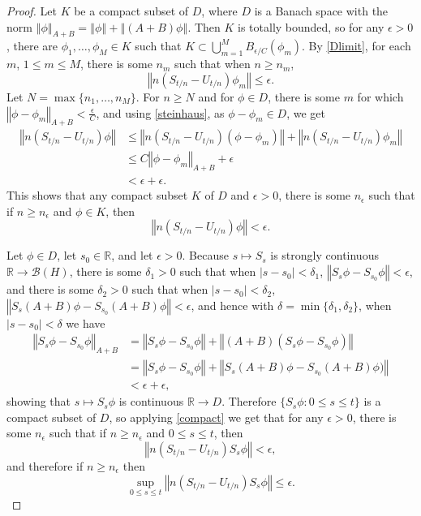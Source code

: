 \documentclass{article}
\newcommand{\norm}[1]{\left\Vert #1 \right\Vert}
\theoremstyle{definition}
\begin{document}
\begin{proof}
Let $K$ be a compact subset of $D$, where $D$ is a Banach space with the norm $\norm{\phi}_{A+B}=\norm{\phi}+\norm{(A+B)\phi}$. 
Then $K$ is totally bounded, so for any $\epsilon>0$, there are $\phi_1,\ldots,\phi_M \in K$ such that
$K \subset \bigcup_{m=1}^M B_{\epsilon/C}(\phi_m)$.
By \eqref{Dlimit}, for each $m$, $1 \leq m \leq M$, there is some $n_m$ such that when $n \geq n_m$,
\[
\norm{n(S_{t/n}-U_{t/n})\phi_m} \leq \epsilon.
\]
Let $N=\max\{n_1,\ldots,n_M\}$. 
For $n \geq N$ and
for $\phi \in D$, there is some $m$ for which
$\norm{\phi-\phi_m}_{A+B} < \frac{\epsilon}{C}$, 
and using \eqref{steinhaus}, as $\phi-\phi_m \in D$, we get
\begin{align*}
\norm{n(S_{t/n}-U_{t/n})\phi}&\leq \norm{n(S_{t/n}-U_{t/n})(\phi-\phi_m)}
+\norm{n(S_{t/n}-U_{t/n})\phi_m}\\
&\leq C\norm{\phi-\phi_m}_{A+B} + \epsilon\\
&<\epsilon+\epsilon.
\end{align*}
This shows that any compact subset $K$ of $D$ and $\epsilon>0$, there is some $n_\epsilon$ such that if
$n \geq n_\epsilon$ and $\phi \in K$, then 
\begin{equation}
\norm{n(S_{t/n}-U_{t/n})\phi}<\epsilon.
\label{compact}
\end{equation}

Let $\phi \in D$,
let  $s_0 \in \mathbb{R}$, and let $\epsilon>0$. 
Because $s \mapsto S_s$ is strongly continuous $\mathbb{R} \to \mathscr{B}(H)$, there is some $\delta_1>0$ such that
when $|s-s_0|<\delta_1$, $\norm{S_s \phi - S_{s_0} \phi}<\epsilon$, and there is some
$\delta_2>0$ such that when $|s-s_0|<\delta_2$, $\norm{S_s (A+B)\phi- S_{s_0}(A+B)\phi}<\epsilon$, and hence
with $\delta=\min\{\delta_1,\delta_2\}$, when $|s-s_0|<\delta$ we have
\begin{align*}
\norm{S_s \phi - S_{s_0} \phi}_{A+B}&=\norm{S_s \phi - S_{s_0}\phi}+
\norm{(A+B)(S_s \phi - S_{s_0}\phi)}\\
&=\norm{S_s \phi - S_{s_0}\phi}+
\norm{S_s(A+B) \phi - S_{s_0}(A+B)\phi)}\\
&<\epsilon+\epsilon,
\end{align*}
showing that $s \mapsto S_s \phi$ is continuous $\mathbb{R} \to D$. Therefore
$\{S_s \phi: 0 \leq s \leq t\}$ is a compact subset of $D$, so applying \eqref{compact} we get that
for any $\epsilon>0$, there is some $n_\epsilon$ such that if $n \geq n_\epsilon$ and $0 \leq s \leq t$, then
\[
\norm{n(S_{t/n}-U_{t/n}) S_s \phi}<\epsilon,
\]
and therefore if $n \geq n_\epsilon$ then
\begin{equation}
\sup_{0 \leq s \leq t} \norm{n(S_{t/n}-U_{t/n}) S_s \phi} \leq \epsilon.
\label{phiinequality}
\end{equation}


\end{proof}
\end{document}
